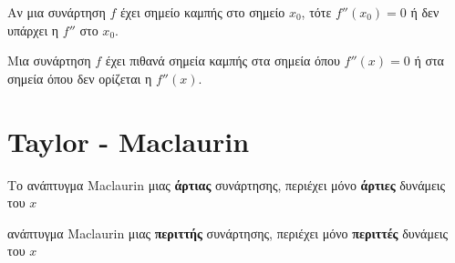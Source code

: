 \begin{prop}
  Αν μια συνάρτηση $f$ έχει σημείο καμπής στο σημείο $ x_{0} $, τότε $ f''(x_{0})=0 $ 
  ή δεν υπάρχει η $f''$ στο $ x_{0} $.
\end{prop}

\begin{rem}
  Μια συνάρτηση $f$ έχει πιθανά σημεία καμπής στα σημεία όπου $ f''(x)=0 $ ή στα 
  σημεία όπου δεν ορίζεται η $ f''(x) $.
\end{rem}

\section*{Taylor - Maclaurin}

\begin{prop}
\item {}
  \begin{myitemize}
    \item Το ανάπτυγμα Maclaurin μιας \textbf{άρτιας} συνάρτησης, περιέχει μόνο
      \textbf{άρτιες} δυνάμεις του $x$ 
    \item ανάπτυγμα Maclaurin μιας \textbf{περιττής} συνάρτησης, περιέχει μόνο
      \textbf{περιττές} δυνάμεις του $x$ 
  \end{myitemize}
\end{prop}




